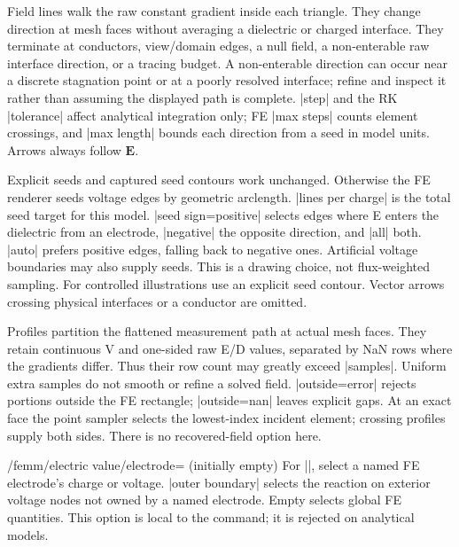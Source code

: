 Field lines walk the raw constant gradient inside each triangle. They change
direction at mesh faces without averaging a dielectric or charged interface.
They terminate at conductors, view/domain edges, a null field, a non-enterable
raw interface direction, or a tracing budget. A non-enterable direction can
occur near a discrete stagnation point or at a poorly resolved interface;
refine and inspect it rather than assuming the displayed path is complete.
|step| and the RK |tolerance| affect analytical integration only; FE
|max steps| counts element crossings, and |max length| bounds each direction
from a seed in model units. Arrows always follow $\mathbf E$.

Explicit seeds and captured seed contours work unchanged. Otherwise the FE
renderer seeds voltage edges by geometric arclength. |lines per charge| is the
total seed target for this model. |seed sign=positive| selects edges where E
enters the dielectric from an electrode, |negative| the opposite direction,
and |all| both. |auto| prefers positive edges, falling back to negative ones.
Artificial voltage boundaries may also supply seeds. This is a drawing choice,
not flux-weighted sampling. For controlled illustrations use an explicit seed
contour. Vector arrows crossing physical interfaces or a conductor are omitted.

Profiles partition the flattened measurement path at actual mesh faces. They
retain continuous V and one-sided raw E/D values, separated by NaN rows where
the gradients differ. Thus their row count may greatly exceed |samples|.
Uniform extra samples do not smooth or refine a solved field. |outside=error|
rejects portions outside the FE rectangle; |outside=nan| leaves explicit gaps.
At an exact face the point sampler selects the lowest-index incident element;
crossing profiles supply both sides. There is no recovered-field option here.

\begin{key}{/femm/electric value/electrode= (initially \normalfont empty)}
For |\femmelectricvalue|, select a named FE electrode's charge or voltage.
|outer boundary| selects the reaction on exterior voltage nodes not owned by
a named electrode. Empty selects global FE quantities. This option is local
to the command; it is rejected on analytical models.
\end{key}

